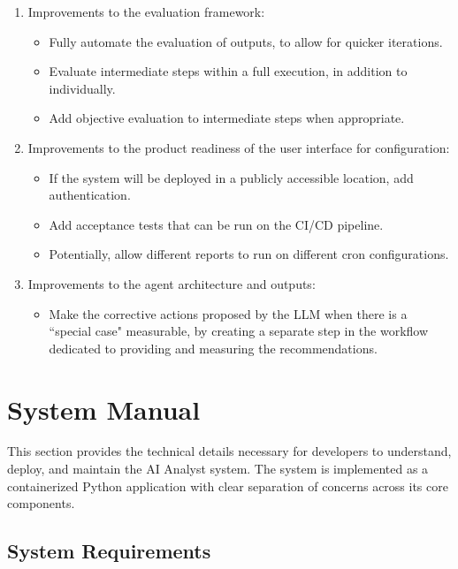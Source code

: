 \documentclass[a4paper]{report}
\begin{document}
\begin{enumerate}
    \item Improvements to the evaluation framework:
    \begin{itemize}
        \item Fully automate the evaluation of outputs, to allow for quicker iterations.
        \item Evaluate intermediate steps within a full execution, in addition to individually.
        \item Add objective evaluation to intermediate steps when appropriate.
    \end{itemize}
    \item Improvements to the product readiness of the user interface for configuration:
    \begin{itemize}
        \item If the system will be deployed in a publicly accessible location, add authentication.
        \item Add acceptance tests that can be run on the CI/CD pipeline.
        \item Potentially, allow different reports to run on different cron configurations.
    \end{itemize}
    \item Improvements to the agent architecture and outputs:
    \begin{itemize}
        \item Make the corrective actions proposed by the LLM when there is a ``special case" measurable, by creating a separate step in the workflow dedicated to providing and measuring the recommendations.
    \end{itemize}
\end{enumerate}

\appendix

\printbibliography

\chapter{System Manual}
\label{chapter:system-manual}

This section provides the technical details necessary for developers to understand, deploy, and maintain the AI Analyst system. The system is implemented as a containerized Python application with clear separation of concerns across its core components.

\section{System Requirements}
\end{document}
